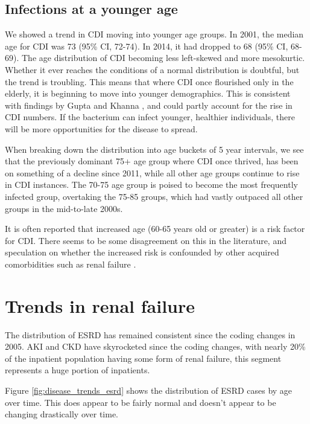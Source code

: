 \documentclass[12pt]{ociamthesis}\usepackage[]{graphicx}\usepackage[]{color}
\newcommand{\ci}[3]{#1 (95\% CI, #2-#3)}
\begin{document}
\subsection{Infections at a younger age}
We showed a trend in CDI moving into younger age groups. 
In 2001, the median age for CDI was \ci{73}{72}{74}. In 2014, it had dropped to \ci{68}{68}{69}.
The age distribution of CDI becoming less left-skewed and more mesokurtic.
Whether it ever reaches the conditions of a normal distribution is doubtful, 
but the trend is troubling. This means that where CDI once flourished only in the elderly, it is beginning to move into younger demographics. 
This is consistent with findings by Gupta and Khanna \cite{Gupta2014}, and could partly account for the rise in CDI numbers. 
If the bacterium can infect younger, healthier individuals, there will be more opportunities for the disease to spread.

When breaking down the distribution into age buckets of 5 year intervals, we see that the previously dominant 75+ age group where
CDI once thrived, has been on something of a decline since 2011, while all other age groups continue to rise in CDI instances.
The 70-75 age group is poised to become the most frequently infected group, overtaking the 75-85 groups, which had vastly
outpaced all other groups in the mid-to-late 2000s.

It is often reported that increased age (60-65 years old or greater) is a risk factor for CDI.
There seems to be some disagreement on this in the literature, and speculation on whether the increased risk is confounded by other
acquired comorbidities such as renal failure \cite{Krapohl2013, Masgala2014}.



\section{Trends in renal failure}


The distribution of ESRD has remained consistent since the coding changes in 2005. AKI and CKD have skyrocketed since the coding changes,
with nearly 20\% of the inpatient population having some form of renal failure, this segment represents a huge portion of inpatients.

Figure \ref{fig:disease_trends_esrd} shows the distribution of ESRD cases by age over time. 
This does appear to be fairly normal and doesn't appear to be changing drastically over time.
\end{document}
